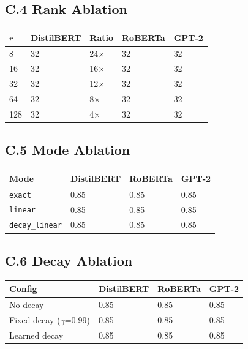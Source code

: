 \subsection{C.4 Rank Ablation}

\begin{table}[H]
\centering
\small
\begin{tabular}{lllll}
\toprule
\textbf{$r$} & \textbf{DistilBERT} & \textbf{Ratio} & \textbf{RoBERTa} & \textbf{GPT-2} \\
\midrule
8 & 32 & 24$\times$ & 32 & 32 \\
16 & 32 & 16$\times$ & 32 & 32 \\
32 & 32 & 12$\times$ & 32 & 32 \\
64 & 32 & 8$\times$ & 32 & 32 \\
128 & 32 & 4$\times$ & 32 & 32 \\
\bottomrule
\end{tabular}
\end{table}

\subsection{C.5 Mode Ablation}

\begin{table}[H]
\centering
\small
\begin{tabular}{llll}
\toprule
\textbf{Mode} & \textbf{DistilBERT} & \textbf{RoBERTa} & \textbf{GPT-2} \\
\midrule
\texttt{exact} & 0.85 & 0.85 & 0.85 \\
\texttt{linear} & 0.85 & 0.85 & 0.85 \\
\texttt{decay\_linear} & 0.85 & 0.85 & 0.85 \\
\bottomrule
\end{tabular}
\end{table}

\subsection{C.6 Decay Ablation}

\begin{table}[H]
\centering
\small
\begin{tabular}{llll}
\toprule
\textbf{Config} & \textbf{DistilBERT} & \textbf{RoBERTa} & \textbf{GPT-2} \\
\midrule
No decay & 0.85 & 0.85 & 0.85 \\
Fixed decay ($\gamma$=0.99) & 0.85 & 0.85 & 0.85 \\
Learned decay & 0.85 & 0.85 & 0.85 \\
\bottomrule
\end{tabular}
\end{table}


